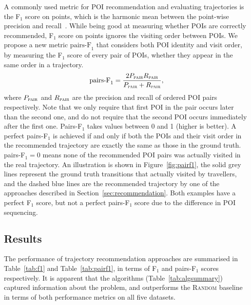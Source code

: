 A commonly used metric for POI recommendation and evaluating trajectories is
the F$_1$ score on points, which is the harmonic mean between the point-wise precision and recall~\cite{ijcai15}.
While being good at measuring whether POIs are correctly recommended,
F$_1$ score on points ignores the visiting order between POIs.
We propose a new metric $\text{pairs-F}_1$ that considers both POI identity and visit order,
by measuring the F$_1$ score of every pair of POIs,
whether they appear in the same order in a trajectory.
\eqmoveup
\begin{displaymath}
\text{pairs-F}_1 = \frac{2 P_{\textsc{pair}} R_{\textsc{pair}}}
                        {P_{\textsc{pair}} + R_{\textsc{pair}}},
\end{displaymath}
where $P_{\textsc{pair}}$ and $R_{\textsc{pair}}$ are the precision and recall of ordered POI pairs respectively. Note that we only require that first POI in the pair occurs
later than the second one,
and do not require that the second POI occurs immediately after the first one.
Pairs-F$_1$ takes values between 0 and 1 (higher is better).
A perfect pairs-F$_1$ is achieved if and only if
both the POIs and their visit order in the
recommended trajectory are exactly the same as those in the ground truth.
pairs-F$_1 = 0$ means none of the recommended POI pairs was actually visited in the real trajectory.
An illustration is shown in Figure~\ref{fig:pairf1},
the solid grey lines represent the ground truth transitions that actually visited by travellers,
and the dashed blue lines are the recommended trajectory by one of the approaches described in Section~\ref{sec:recommendation}.
Both examples have a perfect F$_1$ score, but not a perfect pairs-F$_1$ score due to the difference in POI sequencing.



\subsection{Results}
\label{sec:result}
\secmoveup


%
%
%

The performance of trajectory recommendation approaches are summarised in
Table~\ref{tab:f1} and Table~\ref{tab:pairf1},
in terms of F$_1$ and pairs-F$_1$ scores respectively.
It is apparent that the algorithms (Table~\ref{tab:algsummary})
captured information about the problem, and
outperforms the \textsc{Random} baseline in terms of both performance metrics on all five datasets.


